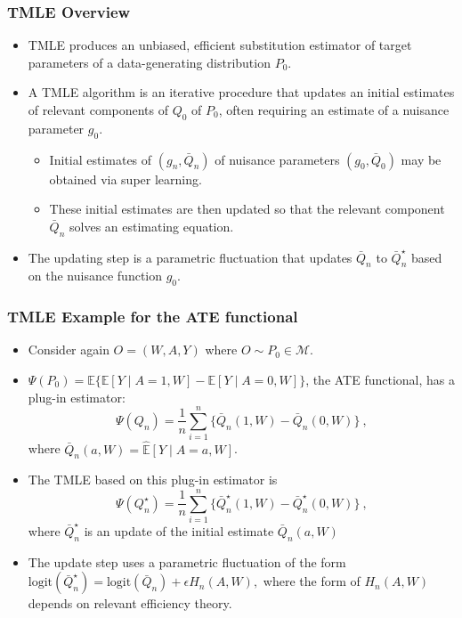 \documentclass[t]{beamer}
\begin{document}
\begin{frame}
  \frametitle{TMLE Overview}
  \begin{itemize}
    \item TMLE produces an unbiased, efficient substitution estimator of target
      parameters of a data-generating distribution $P_0$.
    \item A TMLE algorithm is an iterative procedure that updates an initial
      estimates of relevant components of $Q_0$ of $P_0$, often requiring an
      estimate of a nuisance parameter $g_0$.
      \begin{itemize}
        \item Initial estimates of $(g_n, \bar{Q}_n)$ of nuisance parameters
          $(g_0, \bar{Q}_0)$ may be obtained via super learning.
        \item These initial estimates are then updated so that the relevant
          component $\bar{Q}_n$ solves an estimating equation.
      \end{itemize}
    \item The updating step is a parametric fluctuation that updates $\bar{Q}_n$
      to $\bar{Q}_n^{\star}$ based on the nuisance function $g_0$.
  \end{itemize}
\end{frame}

\begin{frame}
  \frametitle{TMLE Example for the ATE functional}
  \begin{itemize}
    \item Consider again $O = (W, A, Y)$ where $O \sim P_0 \in \mathcal{M}$.
    \item $\Psi(P_0) = \mathbb{E}\{\mathbb{E}[Y \mid A = 1, W] - \mathbb{E}[Y
      \mid A = 0, W]\}$, the ATE functional, has a plug-in estimator:
      $$\Psi(Q_n) = \frac{1}{n}\sum_{i=1}^n\{\bar{Q}_n(1, W) - \bar{Q}_n(0,
      W)\} \ ,$$ where $\bar{Q}_n(a, W) = \hat{\mathbb{E}}[Y \mid A = a, W]$.
    \item The TMLE based on this plug-in estimator is
      $$\Psi(Q_n^{\star}) = \frac{1}{n}\sum_{i=1}^n\{\bar{Q}_n^{\star}(1, W) -
        \bar{Q}_n^{\star}(0, W)\} \ ,$$ where $\bar{Q}_n^{\star}$ is an update
        of the initial estimate $\bar{Q}_n(a, W)$
    \item The update step uses a parametric fluctuation of the form
      $\text{logit}(\bar{Q}_n^{\star}) = \text{logit}(\bar{Q}_n) + \epsilon
      H_n(A,W),$ where the form of $H_n(A,W)$ depends on relevant efficiency
      theory.
  \end{itemize}
\end{frame}
\end{document}
